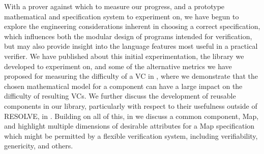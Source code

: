 With a prover against which to measure our progress, and a prototype mathematical and specification system to experiment on, we have begun to explore the engineering considerations inherent in choosing a correct specification, which influences both the modular design of programs intended for verification, but may also provide insight into the language features most useful in a practical verifier.  We have published about this initial experimentation, the library we developed to experiment on, and some of the alternative metrics we have proposed for measuring the difficulty of a VC in \cite{SmithSAVCBS2010}, where we demonstrate that the chosen mathematical model for a component can have a large impact on the difficulty of resulting VCs.  We further discuss the development of reusable components in our library, particularly with respect to their usefulness outside of RESOLVE, in \cite{ICSRJava}.  Building on all of this, in \cite{MapChallengeProblem} we discuss a common component, Map, and highlight multiple dimensions of desirable attributes for a Map specification which might be permitted by a flexible verification system, including verifiability, genericity, and others.
